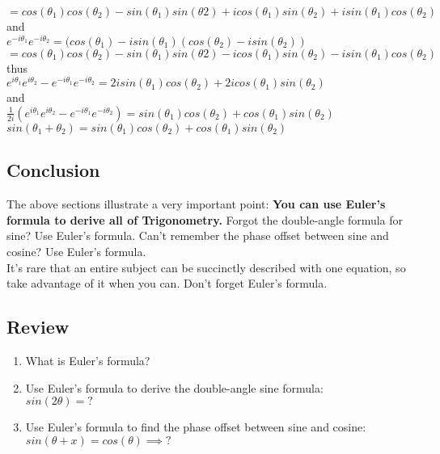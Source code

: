 \tab$= cos(\theta_1)cos(\theta_2) - sin(\theta_1)sin(\theta2) + icos(\theta_1)sin(\theta_2) + isin(\theta_1)cos(\theta_2)$\\

and\\

\tab$e^{-i\theta_1}e^{-i\theta_2} = (cos(\theta_1)-isin(\theta_1)(cos(\theta_2) - isin(\theta_2))$\\

\tab$= cos(\theta_1)cos(\theta_2) - sin(\theta_1)sin(\theta2) - icos(\theta_1)sin(\theta_2) - isin(\theta_1)cos(\theta_2)$\\

thus\\

\tab$e^{i\theta_1}e^{i\theta_2} - e^{-i\theta_1}e^{-i\theta_2} = 2isin(\theta_1)cos(\theta_2) + 2icos(\theta_1)sin(\theta_2)$\\

and\\

\tab$\frac{1}{2i}(e^{i\theta_1}e^{i\theta_2} - e^{-i\theta_1}e^{-i\theta_2}) = sin(\theta_1)cos(\theta_2) + cos(\theta_1)sin(\theta_2)$\\

\tab$sin(\theta_1 + \theta_2) = sin(\theta_1)cos(\theta_2) + cos(\theta_1)sin(\theta_2)$\\

\subsection{Conclusion}

The above sections illustrate a very important point:  {\bf You can use Euler's formula to derive all of Trigonometry.}  Forgot the double-angle formula for sine?  Use Euler's formula.  Can't remember the phase offset between sine and cosine?  Use Euler's formula.\\

It's rare that an entire subject can be succinctly described with one equation, so take advantage of it when you can.  Don't forget Euler's formula.

\subsection{Review}

\begin{enumerate}

\item{What is Euler's formula?}

\item{Use Euler's formula to derive the double-angle sine formula: \\ $sin(2\theta)=?$}

\item{Use Euler's formula to find the phase offset between sine and cosine: \\ $sin(\theta + x) = cos(\theta) \implies ?$}

\end{enumerate}